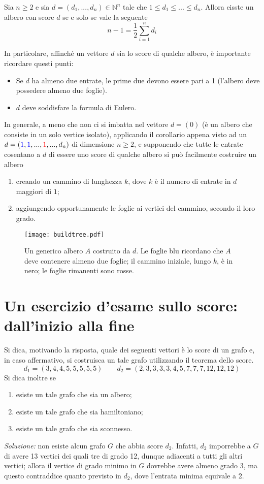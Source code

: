 \begin{tcolorbox}[colback=green!30, colframe=green!30!black, title={Esistenza di alberi con score dato}]
    Sia $n\geq 2$ e sia $d=(d_1,...,d_n)\in\mathbb{N}^n$ tale che $1\leq d_1\leq...\leq d_n$.
    Allora eisste un albero con score $d$ se e solo se vale la seguente \[ n-1 = \frac12\sum_{i=1}^{n}d_i \]
\end{tcolorbox}
In particolare, affinché un vettore $d$ sia lo score di qualche albero, è importante ricordare questi punti:
\begin{itemize}
    \item Se $d$ ha almeno due entrate, le prime due devono essere pari a 1 (l'albero deve possedere almeno due foglie).
    \item $d$ deve soddisfare la formula di Eulero.
\end{itemize}
In generale, a meno che non ci si imbatta nel vettore $d=(0)$ (è un albero
che consiste in un solo vertice isolato), applicando il corollario appena
visto ad un $d=(\textcolor{blue}{1},\textcolor{blue}{1},...,\textcolor{red}{1},...,d_n)$
di dimensione $n\geq2$,
e supponendo che tutte le entrate cosentano a $d$ di essere uno score di
qualche albero si può facilmente costruire un albero
\begin{enumerate}
    \item creando un cammino di lunghezza $k$, dove $k$ è il numero di entrate
    in $d$ maggiori di $1$;
    \item aggiungendo opportunamente le foglie ai vertici del cammino, secondo
    il loro grado.
\end{enumerate}
\begin{figure}[H]
\centering
\texttt{[image: buildtree.pdf]}
\caption{\footnotesize Un generico albero $A$ costruito da $d$. Le foglie blu ricordano che $A$ deve contenere almeno due foglie; il cammino iniziale, lungo $k$, è in nero; le foglie rimanenti sono rosse.}
\end{figure}


\section{Un esercizio d'esame sullo score: dall'inizio alla fine}
Si dica, motivando la risposta, quale dei seguenti
vettori è lo score di un grafo e, in caso affermativo,
si costruisca un tale grafo utilizzando il teorema dello score.
\[ d_1=(3,4,4,5,5,5,5,5) \qquad d_2=(2,3,3,3,3,4,5,7,7,7,12,12,12) \]
Si dica inoltre se
\begin{enumerate}
    \item esiste un tale grafo che sia un albero;
    \item esiste un tale grafo che sia hamiltoniano;
    \item esiste un tale grafo che sia sconnesso.
\end{enumerate}
\textit{Soluzione:} non esiste alcun grafo $G$ che
abbia score $d_2$. Infatti, $d_2$ imporrebbe a $G$
di avere 13 vertici dei quali tre di grado 12,
dunque adiacenti a tutti gli altri vertici; allora
il vertice di grado minimo in $G$ dovrebbe avere
almeno grado 3, ma questo contraddice quanto
previsto in $d_2$, dove l'entrata minima equivale
a 2.

